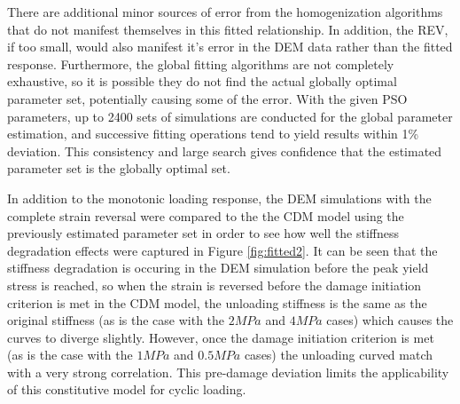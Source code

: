There are additional minor sources of error from the homogenization algorithms that do not manifest themselves in this fitted relationship.  In addition, the REV, if too small, would also manifest it's error in the DEM data rather than the fitted response. Furthermore, the global fitting algorithms are not completely exhaustive, so it is possible they do not find the actual globally optimal parameter set, potentially causing some of the error. With the given PSO parameters, up to 2400 sets of simulations are conducted for the global parameter estimation, and successive fitting operations tend to yield results within 1\% deviation. This consistency and large search gives confidence that the estimated parameter set is the globally optimal set. 

In addition to the monotonic loading response, the DEM simulations with the complete strain reversal were compared to the the CDM model using the previously estimated parameter set in order to see how well the stiffness degradation effects were captured in Figure \ref{fig:fitted2}. It can be seen that the stiffness degradation is occuring in the DEM simulation before the peak yield stress is reached, so when the strain is reversed  before the damage initiation criterion is met in the CDM model, the unloading stiffness is the same as the original stiffness (as is the case with the $2MPa$ and $4MPa$ cases) which causes the curves to diverge slightly. However, once the damage initiation criterion is met (as is the case with the $1MPa$ and $0.5MPa$ cases) the unloading curved match with a very strong correlation. This pre-damage deviation limits the applicability of this constitutive model for cyclic loading.